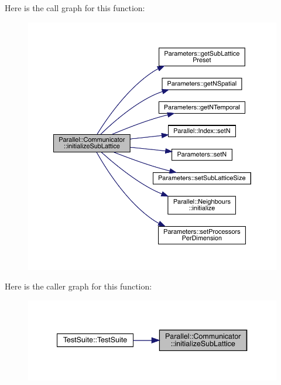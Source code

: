 Here is the call graph for this function\+:
\nopagebreak
\begin{figure}[H]
\begin{center}
\leavevmode
\includegraphics[width=350pt]{class_parallel_1_1_communicator_a3094d713d09225738ecf0250019db115_cgraph}
\end{center}
\end{figure}
Here is the caller graph for this function\+:
\nopagebreak
\begin{figure}[H]
\begin{center}
\leavevmode
\includegraphics[width=340pt]{class_parallel_1_1_communicator_a3094d713d09225738ecf0250019db115_icgraph}
\end{center}
\end{figure}
\mbox{\label{class_parallel_1_1_communicator_a57bb28ee8dbc4efd708a2695423778c4}} 

